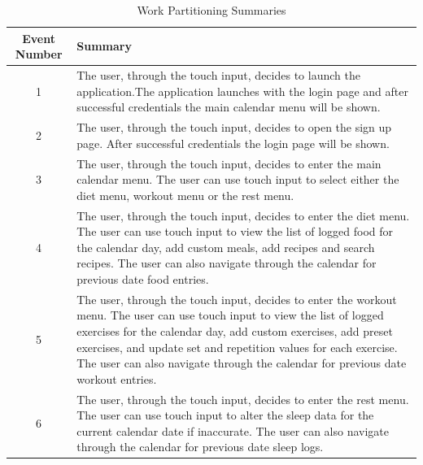 \documentclass[12pt,letterpaper]{article}
\begin{document}
\begin{table}[h]
\caption{Work Partitioning Summaries}
\centering
\begin{tabular}{|c|p{10cm}|}
	\hline
	\textbf{Event Number} & \textbf{Summary} \\
	\hline
	1 & The user, through the touch input, decides to launch the application.The application launches with the login page and after successful credentials the main calendar menu will be shown. \\
	\hline
	2 & The user, through the touch input, decides to open the sign up page. After successful credentials the login page will be shown. \\
	\hline
	3 & The user, through the touch input, decides to enter the main calendar menu. The user can use touch input to select either the diet menu, workout menu or the rest menu. \\
	\hline
	4 & The user, through the touch input, decides to enter the diet menu. The user can use touch input to view the list of logged food for the calendar day, add custom meals, add recipes and search recipes. The user can also navigate through the calendar for previous date food entries. \\
	\hline
	5 & The user, through the touch input, decides to enter the workout menu. The user can use touch input to view the list of logged exercises for the calendar day, add custom exercises, add preset exercises, and update set and repetition values for each exercise. The user can also navigate through the calendar for previous date workout entries. \\
	\hline
	6 & The user, through the touch input, decides to enter the rest menu. The user can use touch input to alter the sleep data for the current calendar date if inaccurate. The user can also navigate through the calendar for previous date sleep logs. \\
	\hline
\end{tabular}
\end{table}
\end{document}
